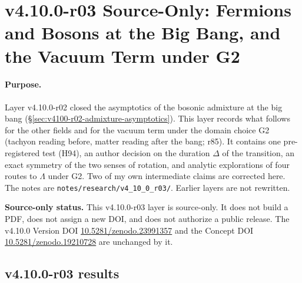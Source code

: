 \clearpage
\section*{v4.10.0-r03 Source-Only: Fermions and Bosons at the Big Bang, and the Vacuum Term under G2}
\label{sec:v4100-r03-bang-g2}

\paragraph{Purpose.}
Layer v4.10.0-r02 closed the asymptotics of the bosonic admixture at the big bang (\S\ref{sec:v4100-r02-admixture-asymptotics}).
This layer records what follows for the other fields and for the vacuum term under the domain choice G2 (tachyon reading before,
matter reading after the bang; r85).  It contains one pre-registered test (H94), an author decision on the duration \(\Delta\) of the
transition, an exact symmetry of the two senses of rotation, and analytic explorations of four routes to \(\Lambda\) under G2.  Two of my own
intermediate claims are corrected here.  The notes are
\texttt{notes/\allowbreak research/\allowbreak v4\_10\_0\_r03/}.  Earlier layers are not rewritten.

\noindent\textbf{Source-only status.}
This v4.10.0-r03 layer is source-only.  It does not build a PDF, does not assign a new DOI,
and does not authorize a public release.  The v4.10.0 Version DOI
\href{https://doi.org/10.5281/zenodo.23991357}{10.5281/zenodo.23991357} and the Concept DOI
\href{https://doi.org/10.5281/zenodo.19210728}{10.5281/zenodo.19210728} are unchanged by it.

\subsection*{v4.10.0-r03 results}
\label{subsec:v4100-r03-results}

